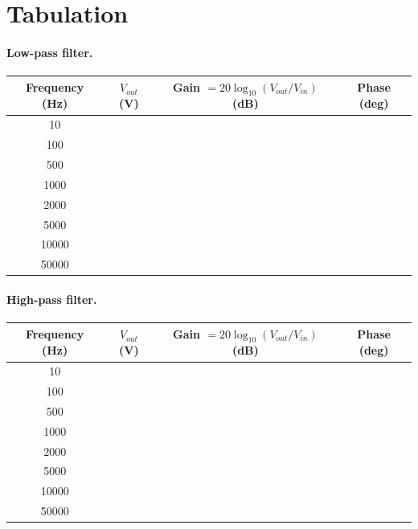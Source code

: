\section{Tabulation}

\paragraph{Low-pass filter.}
\begin{center}
	\begin{tabular}{@{}cccc@{}}
		\toprule
		Frequency (Hz) & $V_{out}$ (V) & Gain $= 20\log_{10}(V_{out}/V_{in})$ (dB) & Phase (deg) \\
		\midrule
		10    & & & \\
		100   & & & \\
		500   & & & \\
		1000  & & & \\
		2000  & & & \\
		5000  & & & \\
		10000 & & & \\
		50000 & & & \\
		\bottomrule
	\end{tabular}
\end{center}

\paragraph{High-pass filter.}
\begin{center}
	\begin{tabular}{@{}cccc@{}}
		\toprule
		Frequency (Hz) & $V_{out}$ (V) & Gain $= 20\log_{10}(V_{out}/V_{in})$ (dB) & Phase (deg) \\
		\midrule
		10    & & & \\
		100   & & & \\
		500   & & & \\
		1000  & & & \\
		2000  & & & \\
		5000  & & & \\
		10000 & & & \\
		50000 & & & \\
		\bottomrule
	\end{tabular}
\end{center}
